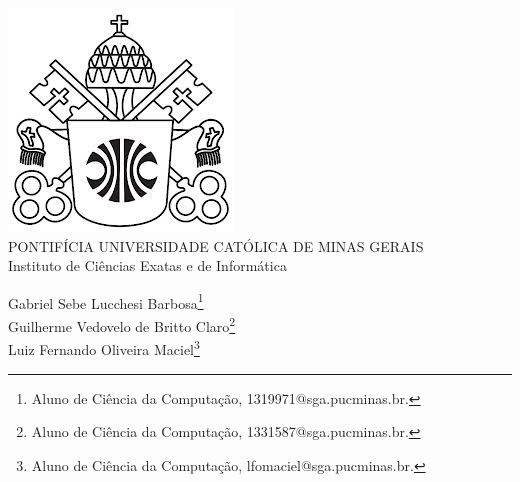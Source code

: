 \documentclass[a4paper,12pt,Times]{article}
\makeatletter
\newcommand{\origem}{Brasil }
\newcommand{\AutorA}{Gabriel Sebe Lucchesi Barbosa}
\newcommand{\funcaoA}{}
\newcommand{\emailA}{1319971@sga.pucminas.br}
\newcommand{\cursA}{Aluno de Ciência da Computação}
\newcommand{\AutorB}{Guilherme Vedovelo de Britto Claro}
\newcommand{\funcaoB}{}
\newcommand{\emailB}{1331587@sga.pucminas.br}
\newcommand{\cursB}{Aluno de Ciência da Computação}
\newcommand{\AutorC}{Luiz Fernando Oliveira Maciel}
\newcommand{\funcaoC}{}
\newcommand{\emailC}{lfomaciel@sga.pucminas.br}
\newcommand{\cursC}{Aluno de Ciência da Computação}
\newcommand{\keyword}[1]{\textsf{#1}}
\makeatother
\begin{document}

\begin{center}
\includegraphics[scale=0.2]{figuras/brasao.jpg} \\
PONTIFÍCIA UNIVERSIDADE CATÓLICA DE MINAS GERAIS \\
Instituto de Ciências Exatas e de Informática


\end{center}

 

\vspace{1.0cm}

\begin{flushright}
\singlespacing 
\normalsize{\AutorA \footnote{\funcaoA \cursA,  \emailA . }} \\
\normalsize{\AutorB \footnote{\funcaoB \cursB,  \emailB . }} \\
\normalsize{\AutorC \footnote{\funcaoC \cursC,  \emailC . }} \\
\end{flushright}
\thispagestyle{empty}

\vspace{1.0cm}

\begin{abstract}
\noindent
Este trabalho consiste na implementação de dois algoritmos que solucionam o problema de otimização de uma rota de coleta e entrega de produtos entre diversas lojas, encontrando o caminho de menor custo.
\\\textbf{\keyword{Palavras-chave: }} Projeto e Análise de Algoritmos. Otimização. Python. Caixeiro Viajante.
\end{abstract}
\end{document}
